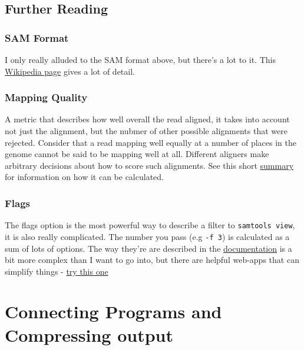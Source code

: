 \documentclass[]{book}
\begin{document}
\hypertarget{further-reading-2}{%
\section{Further Reading}\label{further-reading-2}}

\hypertarget{sam-format-1}{%
\subsection{SAM Format}\label{sam-format-1}}

I only really alluded to the SAM format above, but there's a lot to it. This \href{https://en.wikipedia.org/wiki/SAM_(file_format)}{Wikipedia page} gives a lot of detail.

\hypertarget{mapping-quality}{%
\subsection{Mapping Quality}\label{mapping-quality}}

A metric that describes how well overall the read aligned, it takes into account not just the alignment, but the nubmer of other possible alignments that were rejected. Consider that a read mapping well equally at a number of places in the genome cannot be said to be mapping well at all. Different aligners make arbitrary decisions about how to score such alignments. See this short \href{https://genome.sph.umich.edu/wiki/Mapping_Quality_Scores}{summary} for information on how it can be calculated.

\hypertarget{flags}{%
\subsection{Flags}\label{flags}}

The flags option is the most powerful way to describe a filter to \texttt{samtools\ view}, it is also really complicated. The number you pass (e.g \texttt{-f\ 3}) is calculated as a sum of lots of options. The way they're are described in the \href{https://en.wikipedia.org/wiki/SAM_(file_format)\#Bitwise_Flags}{documentation} is a bit more complex than I want to go into, but there are helpful web-apps that can simplify things - \href{https://broadinstitute.github.io/picard/explain-flags.html}{try this one}

\hypertarget{connecting-programs-and-compressing-output}{%
\chapter{Connecting Programs and Compressing output}\label{connecting-programs-and-compressing-output}}
\end{document}
